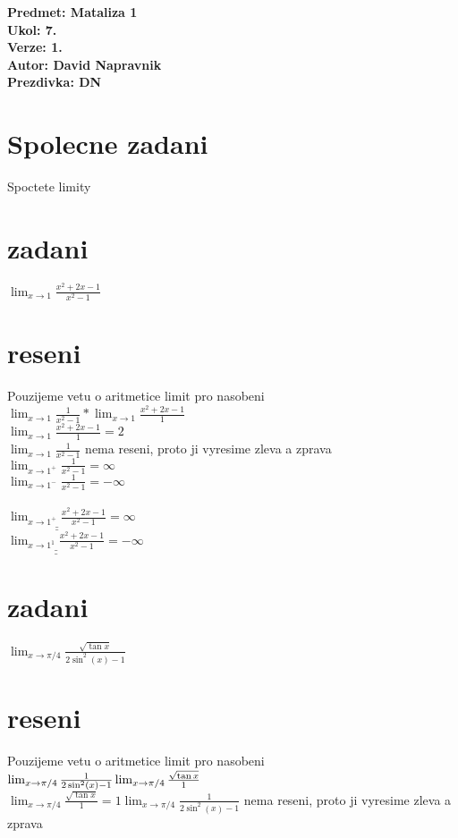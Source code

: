 \documentclass[a4paper]{article}
\def\doubleunderline#1{\underline{\underline{#1}}}
\begin{document}
\noindent
\textbf{Predmet: Mataliza 1}\\
\textbf{Ukol: 7.}\\
\textbf{Verze: 1.}\\
\textbf{Autor: David Napravnik}\\
\textbf{Prezdivka: DN}

\section*{Spolecne zadani}
Spoctete limity

\section*{zadani}
$\lim_{x \rightarrow 1} \frac{x^2 + 2x -1}{x^2-1}$

\section*{reseni}
Pouzijeme vetu o aritmetice limit pro nasobeni\\
$
\lim_{x \rightarrow 1} \frac{1}{x^2-1} *
\lim_{x \rightarrow 1} \frac{x^2 + 2x -1}{1}
$\\
$\lim_{x \rightarrow 1} \frac{x^2 + 2x -1}{1} = 2$\\
$\lim_{x \rightarrow 1} \frac{1}{x^2-1}$ nema reseni, proto ji vyresime zleva a zprava\\
$\lim_{x \rightarrow 1^{+}} \frac{1}{x^2-1} = \infty$\\
$\lim_{x \rightarrow 1^{-}} \frac{1}{x^2-1} = -\infty$\\
\\
$\doubleunderline{\lim_{x \rightarrow 1^+} \frac{x^2 + 2x -1}{x^2-1}} = \infty$\\
$\doubleunderline{\lim_{x \rightarrow 1^1} \frac{x^2 + 2x -1}{x^2-1}} = -\infty$








\section*{zadani}
$\lim_{x \rightarrow \pi / 4} \frac{\sqrt{\tan x}}{2 \sin^2 (x) -1}$

\section*{reseni}
Pouzijeme vetu o aritmetice limit pro nasobeni\\
$
\lim_{x \rightarrow \pi / 4} \frac{1}{2 \sin^2 (x) -1}\\
\lim_{x \rightarrow \pi / 4} \frac{\sqrt{\tan x}}{1}
$\\
$
\lim_{x \rightarrow \pi / 4} \frac{\sqrt{\tan x}}{1} = 1
\lim_{x \rightarrow \pi / 4} \frac{1}{2 \sin^2 (x) -1}$ nema reseni, proto ji vyresime zleva a zprava\\
\end{document}
